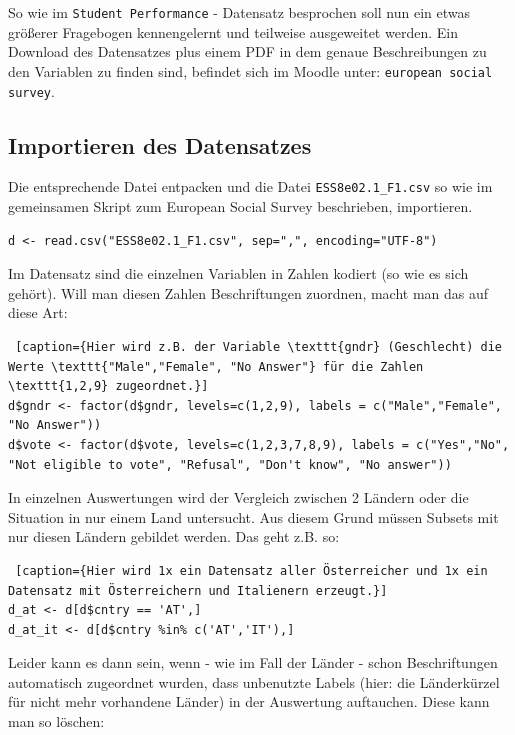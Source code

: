\documentclass{article}
\begin{document}
So wie im \texttt{Student Performance} - Datensatz besprochen soll nun ein etwas größerer Fragebogen kennengelernt und teilweise ausgeweitet werden. Ein Download des Datensatzes plus einem PDF in dem genaue Beschreibungen zu den Variablen zu finden sind, befindet sich im Moodle unter: \texttt{european social survey}.


\subsection{Importieren des Datensatzes}

Die entsprechende Datei entpacken und die Datei \texttt{ESS8e02.1\_F1.csv}  so wie im gemeinsamen Skript zum European Social Survey beschrieben, importieren.

 \begin{lstlisting} 
d <- read.csv("ESS8e02.1_F1.csv", sep=",", encoding="UTF-8") 
 \end{lstlisting}

Im Datensatz sind die einzelnen Variablen in Zahlen kodiert (so wie es sich gehört). Will man diesen Zahlen Beschriftungen zuordnen, macht man das auf diese Art:

 \begin{lstlisting} [caption={Hier wird z.B. der Variable \texttt{gndr} (Geschlecht) die Werte \texttt{"Male","Female", "No Answer"} für die Zahlen \texttt{1,2,9} zugeordnet.}]
d$gndr <- factor(d$gndr, levels=c(1,2,9), labels = c("Male","Female", "No Answer"))
d$vote <- factor(d$vote, levels=c(1,2,3,7,8,9), labels = c("Yes","No", "Not eligible to vote", "Refusal", "Don't know", "No answer"))
 \end{lstlisting}



In einzelnen Auswertungen wird der Vergleich zwischen 2 Ländern oder die Situation in nur einem Land untersucht. Aus diesem Grund müssen Subsets mit nur diesen Ländern gebildet werden. Das geht z.B. so: \\

 \begin{lstlisting} [caption={Hier wird 1x ein Datensatz aller Österreicher und 1x ein Datensatz mit Österreichern und Italienern erzeugt.}]
d_at <- d[d$cntry == 'AT',]
d_at_it <- d[d$cntry %in% c('AT','IT'),]
 \end{lstlisting}

Leider kann es dann sein, wenn - wie im Fall der Länder - schon Beschriftungen automatisch zugeordnet wurden, dass unbenutzte Labels (hier: die Länderkürzel für nicht mehr vorhandene Länder) in der Auswertung auftauchen. Diese kann man so löschen:
\end{document}
